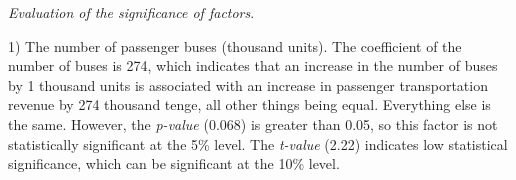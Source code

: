 
\emph{Evaluation of the significance of factors}.

1) The number of passenger buses (thousand units). The coefficient of
the number of buses is 274, which indicates that an increase in the
number of buses by 1 thousand units is associated with an increase in
passenger transportation revenue by 274 thousand tenge, all other things
being equal. Everything else is the same. However, the \emph{p-value}
(0.068) is greater than 0.05, so this factor is not statistically
significant at the 5\% level. The \emph{t-value} (2.22) indicates low
statistical significance, which can be significant at the 10\% level.

